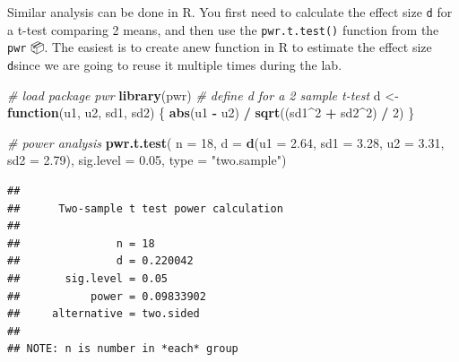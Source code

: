 \documentclass[
  12pt,
]{book}
\newenvironment{Shaded}{\begin{snugshade}}{\end{snugshade}}
\newcommand{\CommentTok}[1]{\textcolor[rgb]{0.56,0.35,0.01}{\textit{#1}}}
\newcommand{\ControlFlowTok}[1]{\textcolor[rgb]{0.13,0.29,0.53}{\textbf{#1}}}
\newcommand{\DataTypeTok}[1]{\textcolor[rgb]{0.13,0.29,0.53}{#1}}
\newcommand{\DecValTok}[1]{\textcolor[rgb]{0.00,0.00,0.81}{#1}}
\newcommand{\FloatTok}[1]{\textcolor[rgb]{0.00,0.00,0.81}{#1}}
\newcommand{\KeywordTok}[1]{\textcolor[rgb]{0.13,0.29,0.53}{\textbf{#1}}}
\newcommand{\NormalTok}[1]{#1}
\newcommand{\OperatorTok}[1]{\textcolor[rgb]{0.81,0.36,0.00}{\textbf{#1}}}
\newcommand{\StringTok}[1]{\textcolor[rgb]{0.31,0.60,0.02}{#1}}
\begin{document}
Similar analysis can be done in R. You first need to calculate the effect size \texttt{d} for a t-test comparing 2 means, and then use the \texttt{pwr.t.test()} function from the \texttt{pwr} 📦.
The easiest is to create anew function in R to estimate the effect size \texttt{d}since we are going to reuse it multiple times during the lab.

\begin{Shaded}
\begin{Highlighting}[]
\CommentTok{\# load package pwr}
\KeywordTok{library}\NormalTok{(pwr)}
\CommentTok{\# define d for a 2 sample t{-}test}
\NormalTok{d \textless{}{-}}\StringTok{ }\ControlFlowTok{function}\NormalTok{(u1, u2, sd1, sd2) \{}
  \KeywordTok{abs}\NormalTok{(u1 }\OperatorTok{{-}}\StringTok{ }\NormalTok{u2) }\OperatorTok{/}\StringTok{ }\KeywordTok{sqrt}\NormalTok{((sd1}\OperatorTok{\^{}}\DecValTok{2} \OperatorTok{+}\StringTok{ }\NormalTok{sd2}\OperatorTok{\^{}}\DecValTok{2}\NormalTok{) }\OperatorTok{/}\StringTok{ }\DecValTok{2}\NormalTok{)}
\NormalTok{\}}

\CommentTok{\# power analysis}
\KeywordTok{pwr.t.test}\NormalTok{(}
  \DataTypeTok{n =} \DecValTok{18}\NormalTok{,}
  \DataTypeTok{d =} \KeywordTok{d}\NormalTok{(}\DataTypeTok{u1 =} \FloatTok{2.64}\NormalTok{, }\DataTypeTok{sd1 =} \FloatTok{3.28}\NormalTok{, }\DataTypeTok{u2 =} \FloatTok{3.31}\NormalTok{, }\DataTypeTok{sd2 =} \FloatTok{2.79}\NormalTok{),}
  \DataTypeTok{sig.level =} \FloatTok{0.05}\NormalTok{,}
  \DataTypeTok{type =} \StringTok{"two.sample"}\NormalTok{)}
\end{Highlighting}
\end{Shaded}

\begin{verbatim}
## 
##      Two-sample t test power calculation 
## 
##               n = 18
##               d = 0.220042
##       sig.level = 0.05
##           power = 0.09833902
##     alternative = two.sided
## 
## NOTE: n is number in *each* group
\end{verbatim}
\end{document}
